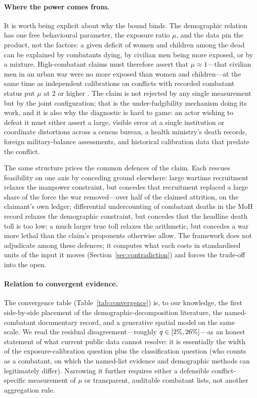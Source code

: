 \paragraph{Where the power comes from.} It is worth being explicit about why the bound binds. The demographic relation has one free behavioural parameter, the exposure ratio $\mu$, and the data pin the product, not the factors: a given deficit of women and children among the dead can be explained by combatants dying, by civilian men being more exposed, or by a mixture. High-combatant claims must therefore assert that $\mu\approx 1$---that civilian men in an urban war were no more exposed than women and children---at the same time as independent calibrations on conflicts with recorded combatant status put $\mu$ at $2$ or higher \citep{frost2026,cockerill2024}. The claim is not rejected by any single measurement but by the joint configuration; that is the under-fudgibility mechanism doing its work, and it is also why the diagnostic is hard to game: an actor wishing to defeat it must either assert a large, visible error at a single institution or coordinate distortions across a census bureau, a health ministry's death records, foreign military-balance assessments, and historical calibration data that predate the conflict.

The same structure prices the common defences of the claim. Each rescues feasibility on one axis by conceding ground elsewhere: large wartime recruitment relaxes the manpower constraint, but concedes that recruitment replaced a large share of the force the war removed---over half of the claimed attrition, on the claimant's own ledger; differential undercounting of combatant deaths in the MoH record relaxes the demographic constraint, but concedes that the headline death toll is too low; a much larger true toll relaxes the arithmetic, but concedes a war more lethal than the claim's proponents otherwise allow. The framework does not adjudicate among these defences; it computes what each costs in standardised units of the input it moves (Section~\ref{sec:contradiction}) and forces the trade-off into the open.

\paragraph{Relation to convergent evidence.} The convergence table (Table~\ref{tab:convergence}) is, to our knowledge, the first side-by-side placement of the demographic-decomposition literature, the named-combatant documentary record, and a generative spatial model on the same scale. We read the residual disagreement---roughly $q\in[2{}\%,26{}\%]$---as an honest statement of what current public data cannot resolve: it is essentially the width of the exposure-calibration question plus the classification question (who counts as a combatant, on which the named-list evidence and demographic methods can legitimately differ). Narrowing it further requires either a defensible conflict-specific measurement of $\mu$ or transparent, auditable combatant lists, not another aggregation rule.

